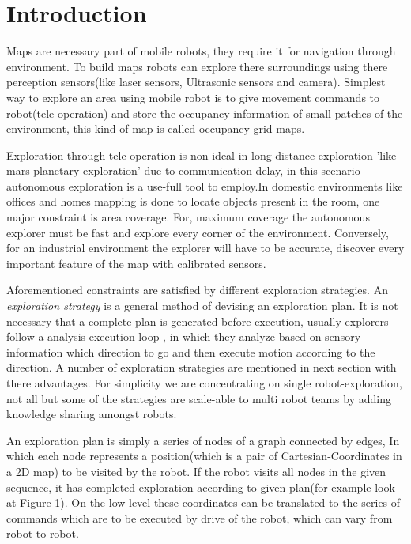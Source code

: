 \section{Introduction}
\label{sec:intro}
Maps are necessary part of mobile robots, they require it for navigation through environment. To
build maps robots can explore there surroundings using there perception sensors(like laser sensors,
Ultrasonic sensors and camera). Simplest way to explore an area using mobile robot is to give
movement commands to robot(tele-operation) and store the occupancy information of small patches of
the environment, this kind of map is called occupancy grid maps. \par

Exploration through tele-operation is non-ideal in long distance exploration 'like mars planetary
exploration' due to communication delay, in this scenario autonomous exploration is a use-full tool
to employ.In domestic environments like offices and homes mapping is done to locate objects present
in the room, one major constraint is area coverage. For, maximum coverage the autonomous explorer
must be fast and explore every corner of the environment. Conversely, for an industrial environment
the explorer will have to be accurate, discover every important feature of the map with calibrated
sensors. \par

Aforementioned constraints are satisfied by different exploration strategies. An \textit{exploration
strategy} is a general method of devising an exploration plan. It is not necessary that a complete
plan is generated before execution, usually explorers follow a analysis-execution loop , in which
they analyze based on sensory information which direction to go and then execute motion according to
the direction. A number of exploration strategies are mentioned in next section with there advantages.
For simplicity we are concentrating on single robot-exploration, not all but some of the strategies
are scale-able to multi robot teams by adding knowledge sharing amongst robots. \par

An exploration plan is simply a series of nodes of a graph connected by edges, In which each node
represents a position(which is a pair of Cartesian-Coordinates in a 2D map) to be visited by the
robot. If the robot visits all nodes in the given sequence, it has completed exploration according
to given plan(for example look at Figure 1). On the low-level these coordinates can be translated to
the series of commands which are to be executed by drive of the robot, which can vary from robot to
robot. \par

